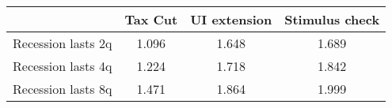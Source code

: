 \begin{tabular}{@{}lccc@{}} 
\toprule 
& Tax Cut    & UI extension    & Stimulus check    \\  \midrule 
Recession lasts 2q &1.096  & 1.648  & 1.689     \\ 
Recession lasts 4q &1.224  & 1.718  & 1.842     \\ 
Recession lasts 8q &1.471  & 1.864  & 1.999     \\ 
\end{tabular}  
